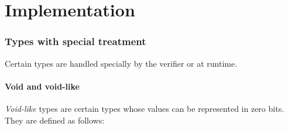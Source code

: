 \documentclass[a4paper]{book}
\begin{document}
\part{Implementation}

\section{Types with special treatment}

Certain types are handled specially by the verifier or at runtime.

\subsection{Void and void-like}
\emph{Void-like} types are certain types whose values can be
represented in zero bits.
They are defined as follows:
\end{document}
